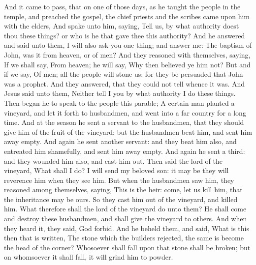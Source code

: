  And it came to pass, that on one of those days, as he
taught the people in the temple, and preached the gospel, the chief
priests and the scribes came upon him with the elders, 
And spake unto him, saying, Tell us, by what authority doest thou these
things? or who is he that gave thee this authority?  And
he answered and said unto them, I will also ask you one thing; and
answer me:  The baptism of John, was it from heaven, or of
men?  And they reasoned with themselves, saying, If we
shall say, From heaven; he will say, Why then believed ye him not?
 But and if we say, Of men; all the people will stone us:
for they be persuaded that John was a prophet.  And they
answered, that they could not tell whence it was.  And
Jesus said unto them, Neither tell I you by what authority I do these
things.  Then began he to speak to the people this
parable; A certain man planted a vineyard, and let it forth to
husbandmen, and went into a far country for a long time. 
And at the season he sent a servant to the husbandmen, that they should
give him of the fruit of the vineyard: but the husbandmen beat him, and
sent him away empty.  And again he sent another servant:
and they beat him also, and entreated him shamefully, and sent him away
empty.  And again he sent a third: and they wounded him
also, and cast him out.  Then said the lord of the
vineyard, What shall I do? I will send my beloved son: it may be they
will reverence him when they see him.  But when the
husbandmen saw him, they reasoned among themselves, saying, This is the
heir: come, let us kill him, that the inheritance may be ours.
 So they cast him out of the vineyard, and killed him.
What therefore shall the lord of the vineyard do unto them?
 He shall come and destroy these husbandmen, and shall
give the vineyard to others. And when they heard it, they said, God
forbid.  And he beheld them, and said, What is this then
that is written, The stone which the builders rejected, the same is
become the head of the corner?  Whosoever shall fall upon
that stone shall be broken; but on whomsoever it shall fall, it will
grind him to powder.


